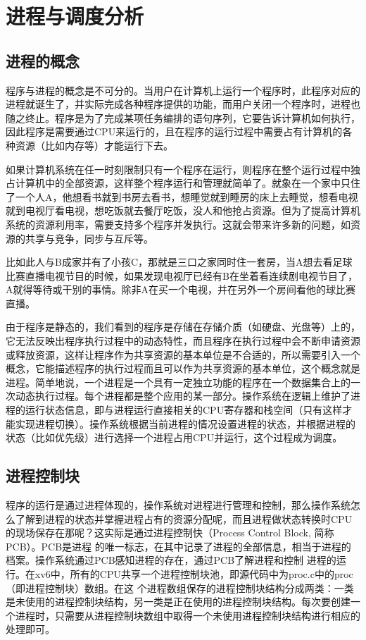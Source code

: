\section{进程与调度分析}

\subsection{进程的概念}

程序与进程的概念是不可分的。当用户在计算机上运行一个程序时，此程序对应的进程就诞生了，并实际完成各种程序提供的功能，而用户关闭一个程序时，进程也随之终止。程序是为了完成某项任务编排的语句序列，它要告诉计算机如何执行，因此程序是需要通过CPU来运行的，且在程序的运行过程中需要占有计算机的各种资源（比如内存等）才能运行下去。

如果计算机系统在任一时刻限制只有一个程序在运行，则程序在整个运行过程中独占计算机中的全部资源，这样整个程序运行和管理就简单了。就象在一个家中只住了一个人A，他想看书就到书房去看书，想睡觉就到睡房的床上去睡觉，想看电视就到电视厅看电视，想吃饭就去餐厅吃饭，没人和他抢占资源。但为了提高计算机系统的资源利用率，需要支持多个程序并发执行。这就会带来许多新的问题，如资源的共享与竞争，同步与互斥等。

比如此人与B成家并有了小孩C，那就是三口之家同时住一套房，当A想去看足球比赛直播电视节目的时候，如果发现电视厅已经有B在坐着看连续剧电视节目了，A就得等待或干别的事情。除非A在买一个电视，并在另外一个房间看他的球比赛直播。

由于程序是静态的，我们看到的程序是存储在存储介质（如硬盘、光盘等）上的，它无法反映出程序执行过程中的动态特性，而且程序在执行过程中会不断申请资源或释放资源，这样让程序作为共享资源的基本单位是不合适的，所以需要引入一个概念，它能描述程序的执行过程而且可以作为共享资源的基本单位，这个概念就是进程。简单地说，一个进程是一个具有一定独立功能的程序在一个数据集合上的一次动态执行过程。每个进程都是整个应用的某一部分。操作系统在逻辑上维护了进程的运行状态信息，即与进程运行直接相关的CPU寄存器和栈空间（只有这样才能实现进程切换）。操作系统根据当前进程的情况设置进程的状态，并根据进程的状态（比如优先级）进行选择一个进程占用CPU并运行，这个过程成为调度。

\subsection{进程控制块}

程序的运行是通过进程体现的，操作系统对进程进行管理和控制，那么操作系统怎么了解到进程的状态并掌握进程占有的资源分配呢，而且进程做状态转换时CPU的现场保存在那呢？这实际是通过进程控制快（Process Control Block, 简称PCB）。PCB是进程 的唯一标志，在其中记录了进程的全部信息，相当于进程的档案。操作系统通过PCB感知进程的存在，通过PCB了解进程和控制 进程的运行。在xv6中，所有的CPU共享一个进程控制块池，即源代码中为proc.c中的proc（即进程控制块）数组。在这 个进程数组保存的进程控制块结构分成两类：一类是未使用的进程控制块结构，另一类是正在使用的进程控制块结构。每次要创建一个进程时，只需要从进程控制块数组中取得一个未使用进程控制块结构进行相应的处理即可。

